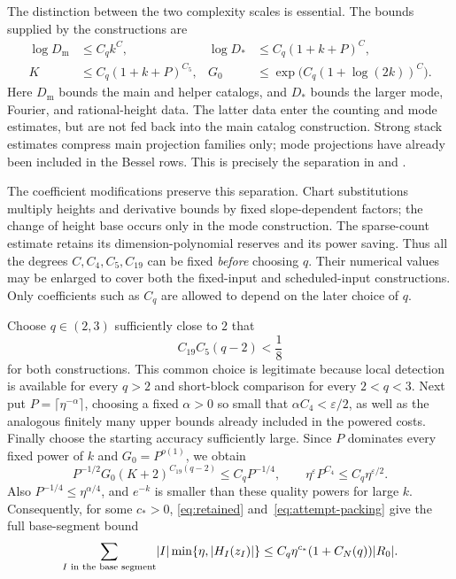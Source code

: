 The distinction between the two complexity scales is essential.
The bounds supplied by the constructions are
\begin{equation}\label{eq:budget-hierarchy}
\begin{aligned}
 \log D_{\mathrm m}&\le C_q k^{C},
 &\log D_*&\le C_q(1+k+P)^C,\\
 K&\le C_q(1+k+P)^{C_5},
 &G_0&\le\exp\bigl(C_q(1+\log(2k))^C\bigr).
\end{aligned}
\end{equation}
Here $D_{\mathrm m}$ bounds the main and helper catalogs, and
$D_*$ bounds the larger mode, Fourier, and rational-height data.
The latter data enter the counting and mode estimates, but are not
fed back into the main catalog construction. Strong stack estimates
compress main projection families only; mode projections have
already been included in the Bessel rows. This is precisely the
separation in \cite[Section~10.3]{H} and \cite[Section~7.3]{V}.

The coefficient modifications preserve this separation. Chart
substitutions multiply heights and derivative bounds by fixed
slope-dependent factors; the change of height base occurs only
in the mode construction. The sparse-count estimate retains its
dimension-polynomial reserves and its power saving. Thus all the
degrees $C,C_4,C_5,C_{19}$ can be fixed \emph{before} choosing $q$.
Their numerical values may be enlarged to cover both the fixed-input
and scheduled-input constructions. Only coefficients such as $C_q$
are allowed to depend on the later choice of $q$.

Choose $q\in(2,3)$ sufficiently close to $2$ that
\begin{equation}\label{eq:common-q}
 C_{19}C_5(q-2)<\frac18
\end{equation}
for both constructions. This common choice is legitimate because
local detection is available for every $q>2$ and short-block
comparison for every $2<q<3$. Next put
$P=\lceil\eta^{-\alpha}\rceil$, choosing a fixed $\alpha>0$ so small
that $\alpha C_4<\varepsilon/2$, as well as the analogous finitely
many upper bounds already included in the powered costs.
Finally choose the starting accuracy sufficiently large. Since $P$
dominates every fixed power of $k$ and $G_0=P^{o(1)}$, we obtain
\[
 P^{-1/2}G_0(K+2)^{C_{19}(q-2)}\le C_qP^{-1/4},\qquad
 \eta^{\varepsilon}P^{C_4}\le C_q\eta^{\varepsilon/2}.
\]
Also $P^{-1/4}\le\eta^{\alpha/4}$, and $e^{-k}$ is smaller than
these quality powers for large $k$. Consequently, for some $c_*>0$,
\eqref{eq:retained} and~\eqref{eq:attempt-packing} give the full
base-segment bound
\begin{equation}\label{eq:quality-gain}
 \sum_{I\text{ in the base segment}}\lvert I\rvert
       \min\{\eta,\lvert H_I(z_I)\rvert\}
 \le C_q\eta^{c_*}(1+C_N(q))\lvert R_0\rvert.
\end{equation}

